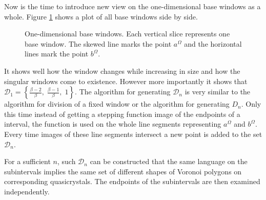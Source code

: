 \documentclass[text.tex]{subfiles}
\begin{document}
Now is the time to introduce new view on the one-dimensional base windows as a whole. Figure \ref{fig:allBaseWindows} shows a plot of all base windows side by side.

\begin{figure}[h!]
\centering
{}
\caption{One-dimensional base windows. Each vertical slice represents one base window. The skewed line marks the point $a^\Omega$ and the horizontal lines mark the point $b^\Omega$.}
\label{fig:allBaseWindows}
\end{figure}

It shows well how the window changes while increasing in size and how the singular windows come to existence. However more importantly it shows that $\mathcal{D}_1 = \left\{\frac{\beta-2}{\beta},\; \frac{\beta-1}{\beta},\; 1\right\}$.
The algorithm for generating $\mathcal{D}_n$ is very similar to the algorithm for division of a fixed window or the algorithm for generating $D_n$. Only this time instead of getting a stepping function image of the endpoints of a interval, the function is used on the whole line segments representing $a^\Omega$ and $b^\Omega$. Every time images of these line segments intersect a new point is added to the set $\mathcal{D}_n$.

For a sufficient $n$, such $\mathcal{D}_n$ can be constructed that the same language on the subintervals implies the same set of different shapes of Voronoi polygons on corresponding quasicrystals. The endpoints of the subintervals are then examined independently. 
\end{document}
